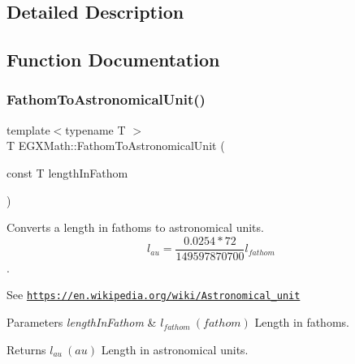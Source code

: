 \subsection{Detailed Description}


\subsection{Function Documentation}
\mbox{\label{group___e_g_x_math-_conversions-_length_conversions-_imperial-_fathom-_astronomical_gaf453178809cd1255a67509e03dc55f6b}} 
\subsubsection{\texorpdfstring{Fathom\+To\+Astronomical\+Unit()}{FathomToAstronomicalUnit()}}
{\footnotesize\ttfamily template$<$typename T $>$ \\
T E\+G\+X\+Math\+::\+Fathom\+To\+Astronomical\+Unit (\begin{DoxyParamCaption}\item[{const T}]{length\+In\+Fathom }\end{DoxyParamCaption})}



Converts a length in fathoms to astronomical units. \[ l_{au}=\frac{0.0254 * 72}{149597870700} l_{fathom} \]. 

See \href{https://en.wikipedia.org/wiki/Astronomical_unit}{\tt https\+://en.\+wikipedia.\+org/wiki/\+Astronomical\+\_\+unit} 
\begin{DoxyParams}{Parameters}
{\em length\+In\+Fathom} & $ l_{fathom}\ (fathom)$ Length in fathoms. \\
\hline
\end{DoxyParams}
\begin{DoxyReturn}{Returns}
$ l_{au}\ (au)$ Length in astronomical units. 
\end{DoxyReturn}
\mbox{\label{group___e_g_x_math-_conversions-_length_conversions-_imperial-_fathom-_astronomical_gaa45a6119423d8aa6928dd9da3fe553e6}} 
